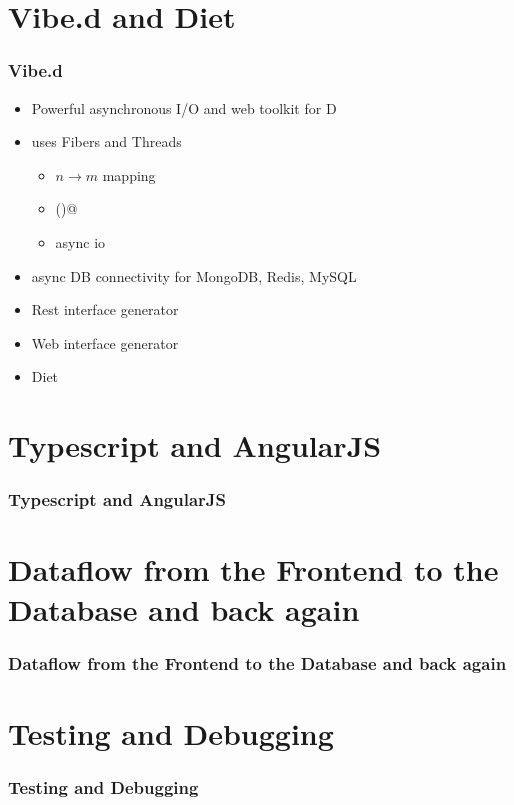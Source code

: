 \documentclass[xelatex,13pt]{beamer}
\begin{document}
\section{Vibe.d and Diet}
\begin{frame}
	\frametitle{Vibe.d}
	\begin{itemize}
		\item Powerful asynchronous I/O and web toolkit for D
			\pause
		\item uses Fibers and Threads
			\pause
			\begin{itemize}
				\item \(n \rightarrow m\) mapping
					\pause
				\item \lstinline@yield()@
					\pause
				\item async io
			\end{itemize}
			\pause
		\item async DB connectivity for MongoDB, Redis, MySQL
			\pause
		\item Rest interface generator
			\pause
		\item Web interface generator
			\pause
		\item Diet
	\end{itemize}
\end{frame}

\section{Typescript and AngularJS}
\begin{frame}
	\frametitle{Typescript and AngularJS}
\end{frame}

\section{Dataflow from the Frontend to the Database and back again}
\begin{frame}
	\frametitle{Dataflow from the Frontend to the Database and back again}
\end{frame}

\section{Testing and Debugging}
\begin{frame}
	\frametitle{Testing and Debugging}
\end{frame}
\end{document}
